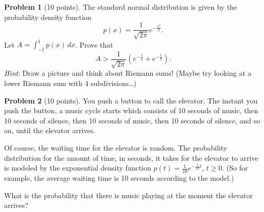 \documentclass[11pt,oneside]{amsart}
\theoremstyle{definition}
\newtheorem{problem}{Problem}
\begin{document}
\newpage

\begin{problem}[10 points]
The standard normal distribution is given by the probability density function
\[p(x)=\frac 1{\sqrt{2\pi}}e^{-\frac{x^2}2}.\]
Let $A=\int_{-1}^1 p(x)\,dx$. Prove that
\[A>\frac 1{\sqrt{2\pi}}\left(e^{-\frac12}+e^{-\frac18}\right).\]
\emph{Hint}: Draw a picture and think about Riemann sums! (Maybe try looking at a lower Riemann sum with 4 subdivisions\ldots)
\end{problem}

\newpage

\begin{problem}[10 points]
You push a button to call the elevator. The instant you push the button, a music cycle starts which consists of 10 seconds of music, then 10 seconds of silence, then 10 seconds of music, then 10 seconds of silence, and so on, until the elevator arrives.

Of course, the waiting time for the elevator is random. The probability distribution for the amount of time, in seconds, it takes for the elevator to arrive is modeled by the exponential density function $p(t)=\frac 1{10}e^{-\frac 1{10}t}$, $t\geq 0$. (So for example, the average waiting time is 10 seconds according to the model.)

What is the probability that there is music playing at the moment the elevator arrives?
\end{problem}


\end{document}
